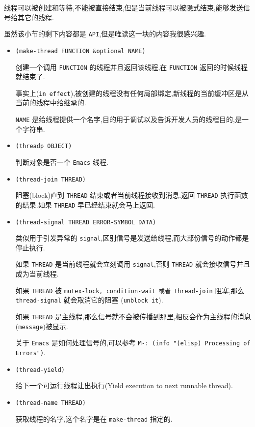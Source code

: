 \documentclass[11pt]{article}
\begin{document}
线程可以被创建和等待,不能被直接结束,但是当前线程可以被隐式结束,能够发送信号给其它的线程.

虽然该小节的剩下内容都是 \texttt{API},但是唯读这一块的内容我很感兴趣.

\begin{itemize}
\item \texttt{(make-thread FUNCTION \&optional NAME)}

创建一个调用 \texttt{FUNCTION} 的线程并且返回该线程,在 \texttt{FUNCTION} 返回的时候线程就结束了.

事实上(\texttt{in effect}),被创建的线程没有任何局部绑定,新线程的当前缓冲区是从当前的线程中给继承的.

\texttt{NAME} 是给线程提供一个名字,目的用于调试以及告诉开发人员的线程目的,是一个字符串.

\item \texttt{(threadp OBJECT)}

判断对象是否一个 \texttt{Emacs} 线程.

\item \texttt{(thread-join THREAD)}

阻塞(block)直到 \texttt{THREAD} 结束或者当前线程接收到消息.返回 \texttt{THREAD} 执行函数的结果.如果 \texttt{THREAD} 早已经结束就会马上返回.

\item \texttt{(thread-signal THREAD ERROR-SYMBOL DATA)}

类似用于引发异常的 \texttt{signal},区别信号是发送给线程,而大部份信号的动作都是停止执行.

如果 \texttt{THREAD} 是当前线程就会立刻调用 \texttt{signal},否则 \texttt{THREAD} 就会接收信号并且成为当前线程.

如果 \texttt{THREAD} 被 \texttt{mutex-lock, condition-wait 或者 thread-join} 阻塞,那么 \texttt{thread-signal} 就会取消它的阻塞 (\texttt{unblock it}).

如果 \texttt{THREAD} 是主线程,那么信号就不会被传播到那里,相反会作为主线程的消息(\texttt{message})被显示.

关于 \texttt{Emacs} 是如何处理信号的,可以参考 \texttt{M-: (info "(elisp) Processing of Errors")}.

\item \texttt{(thread-yield)}

给下一个可运行线程让出执行(Yield execution to next runnable thread).

\item \texttt{(thread-name THREAD)}

获取线程的名字,这个名字是在 \texttt{make-thread} 指定的.


\end{itemize}
\end{document}
